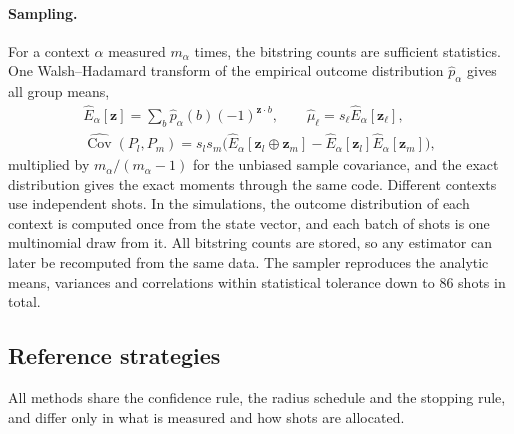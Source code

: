 \documentclass[aps,pra,reprint,superscriptaddress,nofootinbib]{revtex4-2}
\begin{document}
\paragraph{Sampling.} For a context $\alpha$ measured $m_\alpha$ times, the bitstring counts are sufficient statistics. One Walsh--Hadamard transform of the empirical outcome distribution $\hat p_\alpha$ gives all group means,
\begin{gather}
\hat E_\alpha[\bm z]=\sum_b\hat p_\alpha(b)(-1)^{\bm z\cdot b},\qquad
\hat\mu_\ell=s_\ell\hat E_\alpha[\bm z_\ell],\nonumber\\
\widehat{\operatorname{Cov}}(P_l,P_m)=s_ls_m\big(\hat E_\alpha[\bm z_l\oplus\bm z_m]-\hat E_\alpha[\bm z_l]\hat E_\alpha[\bm z_m]\big),
\label{eq:moments}
\end{gather}
multiplied by $m_\alpha/(m_\alpha-1)$ for the unbiased sample covariance, and the exact distribution gives the exact moments through the same code. Different contexts use independent shots. In the simulations, the outcome distribution of each context is computed once from the state vector, and each batch of shots is one multinomial draw from it. All bitstring counts are stored, so any estimator can later be recomputed from the same data. The sampler reproduces the analytic means, variances and correlations within statistical tolerance down to $86$ shots in total.

\subsection{Reference strategies}

All methods share the confidence rule, the radius schedule and the stopping rule, and differ only in what is measured and how shots are allocated.
\end{document}
